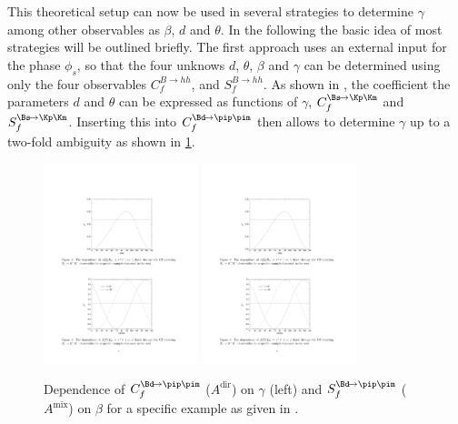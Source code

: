 This theoretical setup can now be used in several strategies to determine $\gamma$ among other observables as $\beta$, $d$ and $\theta$.
In the following the basic idea of most strategies will be outlined briefly.
The first approach uses an external input for the phase $\phi_s$, so that the four unknows $d$, $\theta$, $\beta$ and $\gamma$ can be determined using only the four observables $C_{f}^{B\!\to hh}$, and $S_{f}^{B\!\to hh}$.
As shown in \cite{GammaInLoops_Fleischer}, the coefficient the parameters $d$ and $\theta$ can be expressed as functions of $\gamma$, $C_{f}^{\Bs\!\to\Kp\Km}$ and $S_{f}^{\Bs\!\to\Kp\Km}$.
Inserting this into $C_{f}^{\Bd\!\to\pip\pim}$ then allows to determine $\gamma$ up to a two-fold ambiguity as shown in \cref{fig:gamma_beta_fleischer}.
\begin{figure}[tbp]
	\centering
	\includegraphics[width=0.4\textwidth]{04gamma/figs/GammaVsCf.pdf}
	\includegraphics[width=0.4\textwidth]{04gamma/figs/BetaVsSf.pdf}
	\caption{Dependence of $C_{f}^{\Bd\!\to\pip\pim}$ ($A^{\text{dir}}$) on $\gamma$ (left) and $S_{f}^{\Bd\!\to\pip\pim}$ ($A^{\text{mix}}$) on $\beta$ for a specific example as given in \cite{GammaInLoops_Fleischer}.}
	\label{fig:gamma_beta_fleischer}
\end{figure}
